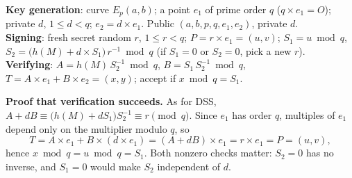 \begin{mustknow}[: ECDSA]
\textbf{Key generation}: curve $E_p(a, b)$; a point $e_1$ of prime order $q$ ($q \times e_1 = O$); private $d$, $1 \le d < q$; $e_2 = d \times e_1$. Public $(a, b, p, q, e_1, e_2)$, private $d$.\\
\textbf{Signing}: fresh secret random $r$, $1 \le r < q$; $P = r \times e_1 = (u, v)$;
\;$S_1 = u \bmod q$, \;$S_2 = \big(h(M) + d \times S_1\big)\, r^{-1} \bmod q$ (if $S_1 = 0$ or $S_2 = 0$, pick a new $r$).\\
\textbf{Verifying}: $A = h(M)\,S_2^{-1} \bmod q$, \;$B = S_1\,S_2^{-1} \bmod q$, \;$T = A \times e_1 + B \times e_2 = (x, y)$; accept if $x \bmod q = S_1$.
\end{mustknow}

\textbf{Proof that verification succeeds.} As for DSS, $A + dB \equiv \big(h(M) + d S_1\big) S_2^{-1} \equiv r \pmod q$. Since $e_1$ has order $q$, multiples of $e_1$ depend only on the multiplier modulo $q$, so
\[
T = A \times e_1 + B \times (d \times e_1) = (A + dB) \times e_1 = r \times e_1 = P = (u, v),
\]
hence $x \bmod q = u \bmod q = S_1$. Both nonzero checks matter: $S_2 = 0$ has no inverse, and $S_1 = 0$ would make $S_2$ independent of $d$.

